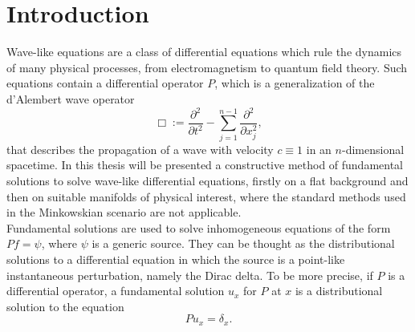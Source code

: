 
\chapter*{Introduction}
\label{introduction}

\thispagestyle{plain}
Wave-like equations are a class of differential equations which rule the dynamics of many physical processes, from electromagnetism to quantum field theory. Such equations contain a differential operator $P$, which is a generalization of the d'Alembert wave operator
\[\Box:=\frac{\partial^2}{\partial t^2}-\sum_{j=1}^{n-1}\frac{\partial^2}{\partial x_j^2}, \]
that describes the propagation of a wave with velocity $c\equiv 1$ in an $n$-dimensional spacetime.
In this thesis will be presented a constructive method of fundamental solutions to solve wave-like differential equations, firstly on a flat background and then on suitable manifolds of physical interest, where the standard methods used in the Minkowskian scenario are not applicable.\\

\noindent Fundamental solutions are used to solve inhomogeneous equations of the form $Pf=\psi$, where $\psi$ is a generic source. They can be thought as the distributional solutions to a differential equation in which the source is a point-like instantaneous perturbation, namely the Dirac delta. To be more precise, if $P$ is a differential operator, a fundamental solution $u_x$ for $P$ at $x$ is a distributional solution to the equation
\[	Pu_x=\delta_x.	\]

